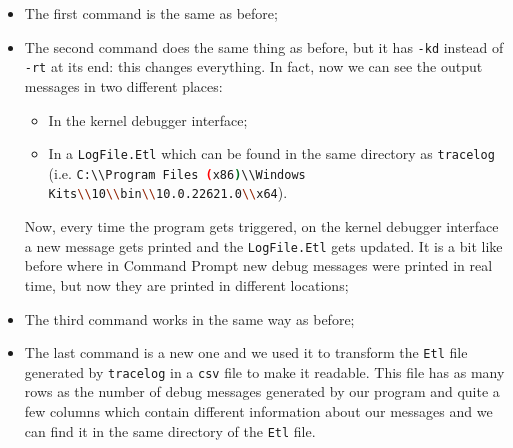 \begin{itemize}
	\item 
		The first command is the same as before;
	\item 
		The second command does the same thing as before, but it has \colorbox{backcolour}{\lstinline[style=commandline, language=bash, breaklines=true]|-kd|} instead of \colorbox{backcolour}{\lstinline[style=commandline, language=bash, breaklines=true]|-rt|} at its end: this changes everything.
		In fact, now we can see the output messages in two different places:
		\begin{itemize}
			\item 
				In the kernel debugger interface;
			\item 
				In a \colorbox{backcolour}{\lstinline[style=commandline, language=bash, breaklines=true]|LogFile.Etl|} which can be found in the same directory as \colorbox{backcolour}{\lstinline[style=commandline, language=bash, breaklines=true]|tracelog|} (i.e. \colorbox{backcolour}{\lstinline[style=commandline, language=bash, breaklines=true]|C:\\Program Files (x86)\\Windows Kits\\10\\bin\\10.0.22621.0\\x64|}).
		\end{itemize}
		Now, every time the program gets triggered, on the kernel debugger interface a new message gets printed and the \colorbox{backcolour}{\lstinline[style=commandline, language=bash, breaklines=true]|LogFile.Etl|} gets updated.
		It is a bit like before where in Command Prompt new debug messages were printed in real time, but now they are printed in different locations;
	\item 
		The third command works in the same way as before;
	\item 
		The last command is a new one and we used it to transform the \colorbox{backcolour}{\lstinline[style=commandline, language=bash, breaklines=true]|Etl|} file generated by \colorbox{backcolour}{\lstinline[style=commandline, language=bash, breaklines=true]|tracelog|} in a \colorbox{backcolour}{\lstinline[style=commandline, language=bash, breaklines=true]|csv|} file to make it readable.
		This file has as many rows as the number of debug messages generated by our program and quite a few columns which contain different information about our messages and we can find it in the same directory of the \colorbox{backcolour}{\lstinline[style=commandline, language=bash, breaklines=true]|Etl|} file.
\end{itemize}

